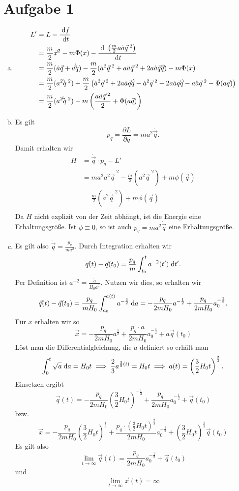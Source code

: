 \documentclass{article}
\theoremstyle{definition}
\begin{document}
\section*{Aufgabe 1}
\begin{enumerate}[(a)]
    \item \begin{align*}
        L' &= L - \frac{\d f}{\d t}\\
        &= \frac{m}{2}\vec x^2 - m \Phi(x) - \frac{\d\ \left(\frac{m}{2}a\dot a\vec q^{\;2}\right)}{\d t}\\
        &= \frac{m}{2}(\dot a \vec q + a \dot \vec q) - \frac{m}{2}(\dot a^2\vec q^{\;2} + a\ddot a\vec q^{\;2} + 2 a\dot a\vec{q} \dot{\vec{q}}) - m \Phi(x)\\
        &= \frac{m}{2}(a^2 \dot \vec{q}^{\; 2}) + \frac{m}{2} \left(\dot a^2 \vec q^{\;2} + 2a\dot a \vec{q} \dot{\vec{q}} - \dot a^2 \vec q^{\;2} - 2a\dot a \vec{q} \dot{\vec{q}} - a\ddot a\vec q^{\;2} - \Phi(a \vec q)\right)\\
        &= \frac{m}{2}(a^2 \dot \vec{q}^{\; 2}) - m\left(\frac{a\ddot a\vec q^{\;2}}{2} + \Phi(a \vec q)\right)
    \end{align*}
    \item Es gilt $$p_q = \frac{\partial L}{\partial \dot q} = m a^2 \dot{\vec{q}}.$$ Damit erhalten wir
    \begin{align*}
        H &= \dot \vec q \cdot p_q - L'\\
        &= m a^2 a^2 \dot \vec{q}^{\; 2} - \frac{m}{2}(a^2 \dot \vec{q}^{\; 2}) + m \phi(\vec q)\\
        &= \frac{m}{2}(a^2 \dot \vec{q}^{\; 2}) + m \phi(\vec q)\\
    \end{align*}
    Da $H$ nicht explizit von der Zeit abhängt, ist die Energie eine Erhaltungsgröße.
    Ist $\phi \equiv 0$, so ist auch $p_q = m a^2 \dot{\vec{q}}$ eine Erhaltungsgröße.
    \item Es gilt also $\dot{\vec{q}} = \frac{p_q}{ma^2}$. Durch Integration erhalten wir
    $$\vec q(t) - \vec q(t_0) = \frac{p_q}{m} \int_ {t_0}^t a^{-2}(t') \d t'.$$ Per Definition ist $a^{-2} = \frac{\dot a}{H_0a^{\frac{3}{2}}}$. Nutzen wir dies, so erhalten wir
    $$\vec q(t) - \vec q(t_0) = \frac{p_q}{mH_0} \int_{a_0}^{a(t)} a^{-\frac{3}{2}} \d a = - \frac{p_q}{2mH_0}a^{-\frac{1}{2}} + \frac{p_q}{2mH_0}a_0^{-\frac{1}{2}}.$$
    Für $x$ erhalten wir so 
    $$\vec x = - \frac{p_q}{2mH_0}a^{\frac{1}{2}} + \frac{p_q\cdot a}{2mH_0}a_0^{-\frac{1}{2}} + a\vec q(t_0)$$
    Löst man die Differentialgleichung, die $a$ definiert so erhält man 
    $$\int_0^t\sqrt{a}\d a = H_0 t \implies \frac{2}{3}a^{\frac{3}{2}(t)} = H_0 t \implies a(t) = \left(\frac{3}{2}H_0t\right)^{\frac{2}{3}}.$$
    Einsetzen ergibt $$\vec q(t) = - \frac{p_q}{2mH_0}\left(\frac{3}{2}H_0t\right)^{-\frac{1}{3}} + \frac{p_q}{2mH_0}a_0^{-\frac{1}{2}} + \vec q(t_0)$$ bzw.
    $$\vec x = - \frac{p_q}{2mH_0}\left(\frac{3}{2}H_0t\right)^\frac{1}{3} + \frac{p_q\cdot \left(\frac{3}{2}H_0t\right)^\frac{2}{3}}{2mH_0}a_0^{-\frac{1}{2}} + \left(\frac{3}{2}H_0t\right)^{\frac{2}{3}}\vec q(t_0)$$
    Es gilt also $$\lim\limits_{t\to\infty}\vec q(t) = \frac{p_q}{2mH_0}a_0^{-\frac{1}{2}} + \vec q(t_0)$$ und $$\lim\limits_{t\to\infty} \vec x(t) = \infty$$
\end{enumerate}
\end{document}
